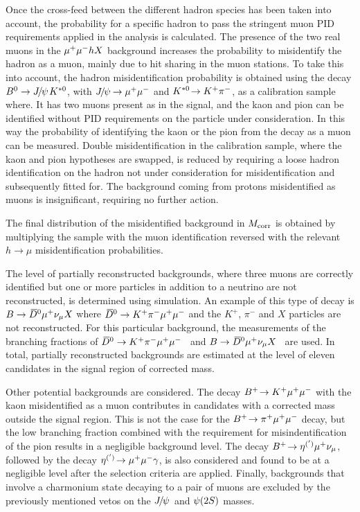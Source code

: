 Once the cross-feed between the different hadron species has been taken into account,
the probability for a specific hadron to pass the stringent muon PID requirements
applied in the analysis is calculated. The presence of the two real muons in the
${\mu^+\mu^-} h X$ background increases the probability to misidentify the hadron as a muon,
mainly due to hit sharing in the muon stations. To take this into account, the hadron
misidentification probability is obtained using the decay ${{B}^0} \rightarrow {\ensuremath{{J\mskip -3mu/\mskip -2mu\psi\mskip 2mu}}} {\ensuremath{{K}^{*0}}}$, with ${{J\mskip -3mu/\mskip -2mu\psi\mskip 2mu}}\!\rightarrow {\ensuremath{\mu^+}}{\ensuremath{\mu^-}}$ and ${{K}^{*0}}\!\rightarrow {\ensuremath{{K}^+}}{\ensuremath{{\pi}^-}}$, as a calibration sample where.
It has two muons present as in the signal, and the kaon and pion can be identified
without PID requirements on the particle under consideration. 
In this way the probability of identifying the kaon or the
pion from the \Kstarz decay as a muon can be measured.
Double misidentification in the calibration sample, where the kaon and pion 
hypotheses are swapped, is reduced by requiring a loose hadron identification
on the hadron not under consideration for misidentification and subsequently 
fitted for. 
The background coming from
protons misidentified as muons is insignificant, requiring no further action.

The final distribution of the misidentified background in $M_{\rm{corr}}$ is obtained by multiplying the sample with the muon identification reversed with the relevant $h\to\mu$ misidentification probabilities.

The level of partially reconstructed backgrounds, where three muons are correctly identified but one or more particles in addition to a neutrino are not reconstructed, is determined using simulation. An example of this type of decay is \mbox{${{B} \rightarrow {\ensuremath{{\kern 0.2em\overline{\kern -0.2em D}{}}{}^0}} {\ensuremath{\mu^+}} \nu_{\mu} X}$} where ${{\kern 0.2em\overline{\kern -0.2em D}{}}{}^0} \rightarrow {\ensuremath{{K}^+}} {\ensuremath{{\pi}^-}} {\ensuremath{\mu^+}} {\ensuremath{\mu^-}}$ and the $K^{+}$, $\pi^{-}$ and $X$ particles are not reconstructed. For this particular background, the measurements of the branching fractions of ${{\kern 0.2em\overline{\kern -0.2em D}{}}{}^0} \rightarrow K^{+} \pi^{-} \mu^{+} \mu^{-}$~\cite{LHCb-PAPER-2015-043} and ${B} \rightarrow {\ensuremath{{\kern 0.2em\overline{\kern -0.2em D}{}}{}^0}} \mu^{+} \nu_{\mu} X$~\cite{PDG2018} are used. In total, partially reconstructed backgrounds are estimated at the level of eleven candidates in the signal region of corrected mass.

Other potential backgrounds are considered. The decay
${{{B}^+}}\!\rightarrow {\ensuremath{{K}^+}}{\ensuremath{\mu^+}}{\ensuremath{\mu^-}}$ with the kaon misidentified as a muon
contributes in candidates with a corrected mass outside the signal region.
This is not the case for the ${{{B}^+}}\!\rightarrow {\ensuremath{{\pi}^+}}{\ensuremath{\mu^+}}{\ensuremath{\mu^-}}$ decay, but the
low branching fraction combined with the requirement for
misindentification of the pion results in a negligible background level.
The decay ${{{B}^+}}\!\rightarrow \eta^{(')}{\mu^+}\nu_\mu$, followed by the decay
$\eta^{(')}\!\rightarrow {\ensuremath{\mu^+}}{\ensuremath{\mu^-}}\gamma$, is also considered and found to be at a
negligible level after the selection criteria are applied.
Finally, backgrounds that involve a charmonium state decaying to a pair 
of muons are excluded by the previously mentioned vetos on the ${{J\mskip -3mu/\mskip -2mu\psi\mskip 2mu}}$ and
${\psi{(2S)}}$ masses.
